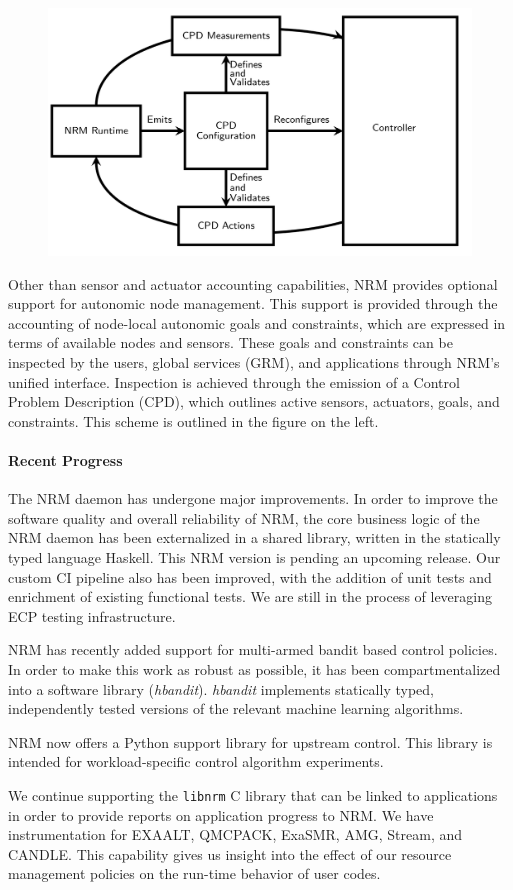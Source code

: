 \begin{figure}
\includegraphics[width=.38\textwidth]{projects/2.3.1-PMR/2.3.1.19-Argo-PowerSteering/cpd}
\end{figure}
Other than sensor and actuator accounting capabilities, NRM provides
optional support for autonomic node management. This support is provided through
the accounting of node-local autonomic goals and constraints, which are
expressed in terms of available nodes and sensors. These goals and
constraints can be inspected by the users, global services (GRM), and
applications through NRM's unified interface. Inspection is achieved through
the emission of a Control Problem Description (CPD), which outlines active
sensors, actuators, goals, and constraints. This scheme is outlined in the
figure on the left.

\paragraph{Recent Progress}

The NRM daemon has undergone major improvements. In order to improve the
software quality and overall reliability of NRM, the core business logic
of the NRM daemon has been externalized in a shared library, written in the
statically typed language Haskell. This NRM version is pending an upcoming
release. Our custom CI pipeline also has been improved, with the addition
of unit tests and enrichment of existing functional tests. We are still in
the process of leveraging ECP testing infrastructure.

NRM has recently added support for multi-armed bandit based control policies.
In order to make this work as robust as possible, it has been
compartmentalized into a software library (\textit{hbandit}). \textit{hbandit}
implements statically typed, independently tested versions of the relevant
machine learning algorithms.

NRM now offers a Python support library for upstream control. This library is
intended for workload-specific control algorithm experiments.

We continue supporting the \texttt{libnrm} C library that can be linked to
applications in order to provide reports on application progress to NRM. We have
instrumentation for EXAALT, QMCPACK, ExaSMR, AMG, Stream, and CANDLE.
This capability gives us insight into the effect of our resource management
policies on the run-time behavior of user codes.

